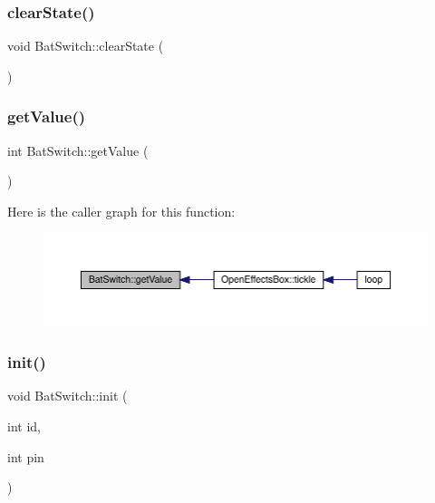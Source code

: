 \subsubsection{\texorpdfstring{clear\+State()}{clearState()}}
{\footnotesize\ttfamily void Bat\+Switch\+::clear\+State (\begin{DoxyParamCaption}{ }\end{DoxyParamCaption})}

\mbox{\label{class_bat_switch_a2a41a055ec34dbc7169f3b2161e84075}} 
\subsubsection{\texorpdfstring{get\+Value()}{getValue()}}
{\footnotesize\ttfamily int Bat\+Switch\+::get\+Value (\begin{DoxyParamCaption}{ }\end{DoxyParamCaption})}

Here is the caller graph for this function\+:\nopagebreak
\begin{figure}[H]
\begin{center}
\leavevmode
\includegraphics[width=350pt]{class_bat_switch_a2a41a055ec34dbc7169f3b2161e84075_icgraph}
\end{center}
\end{figure}
\mbox{\label{class_bat_switch_a144b8789518472a4d5dc19f09968148e}} 
\subsubsection{\texorpdfstring{init()}{init()}}
{\footnotesize\ttfamily void Bat\+Switch\+::init (\begin{DoxyParamCaption}\item[{int}]{id,  }\item[{int}]{pin }\end{DoxyParamCaption})}

